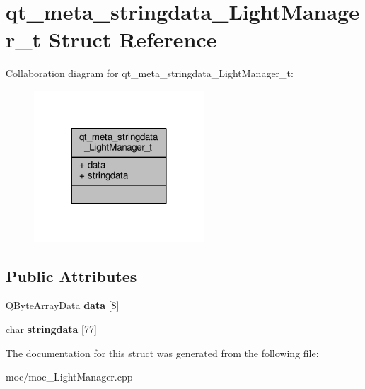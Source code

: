 \hypertarget{structqt__meta__stringdata___light_manager__t}{\section{qt\-\_\-meta\-\_\-stringdata\-\_\-\-Light\-Manager\-\_\-t Struct Reference}
\label{structqt__meta__stringdata___light_manager__t}
}


Collaboration diagram for qt\-\_\-meta\-\_\-stringdata\-\_\-\-Light\-Manager\-\_\-t\-:
\nopagebreak
\begin{figure}[H]
\begin{center}
\leavevmode
\includegraphics[width=180pt]{structqt__meta__stringdata___light_manager__t__coll__graph}
\end{center}
\end{figure}
\subsection*{Public Attributes}
\begin{DoxyCompactItemize}
\item 
\hypertarget{structqt__meta__stringdata___light_manager__t_a2211d81e49e3322e3884322db4a02cba}{Q\-Byte\-Array\-Data {\bfseries data} \mbox{[}8\mbox{]}}\label{structqt__meta__stringdata___light_manager__t_a2211d81e49e3322e3884322db4a02cba}

\item 
\hypertarget{structqt__meta__stringdata___light_manager__t_ad07a1a7de58bcafe52d5d4b6d547276f}{char {\bfseries stringdata} \mbox{[}77\mbox{]}}\label{structqt__meta__stringdata___light_manager__t_ad07a1a7de58bcafe52d5d4b6d547276f}

\end{DoxyCompactItemize}


The documentation for this struct was generated from the following file\-:\begin{DoxyCompactItemize}
\item 
moc/moc\-\_\-\-Light\-Manager.\-cpp\end{DoxyCompactItemize}
